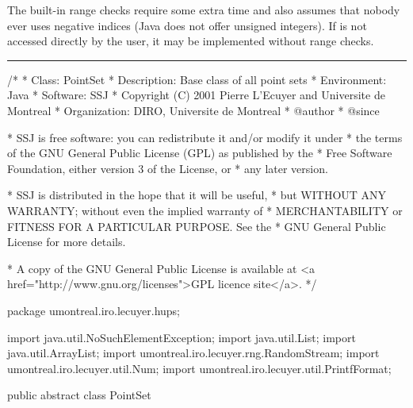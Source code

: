 \begin{detailed}  %
The built-in range checks require some extra time and also
assumes that nobody ever uses negative indices (Java does not offer unsigned
integers).  If  is not accessed directly by the user,
it may be implemented without range checks.
\end{detailed}  %

\bigskip\hrule\bigskip

\begin{code}
\begin{hide}
/*
 * Class:        PointSet
 * Description:  Base class of all point sets
 * Environment:  Java
 * Software:     SSJ 
 * Copyright (C) 2001  Pierre L'Ecuyer and Universite de Montreal
 * Organization: DIRO, Universite de Montreal
 * @author       
 * @since

 * SSJ is free software: you can redistribute it and/or modify it under
 * the terms of the GNU General Public License (GPL) as published by the
 * Free Software Foundation, either version 3 of the License, or
 * any later version.

 * SSJ is distributed in the hope that it will be useful,
 * but WITHOUT ANY WARRANTY; without even the implied warranty of
 * MERCHANTABILITY or FITNESS FOR A PARTICULAR PURPOSE.  See the
 * GNU General Public License for more details.

 * A copy of the GNU General Public License is available at
   <a href="http://www.gnu.org/licenses">GPL licence site</a>.
 */
\end{hide}
package umontreal.iro.lecuyer.hups;\begin{hide}

import java.util.NoSuchElementException;
import java.util.List;
import java.util.ArrayList;
import umontreal.iro.lecuyer.rng.RandomStream;
import umontreal.iro.lecuyer.util.Num;
import umontreal.iro.lecuyer.util.PrintfFormat;
\end{hide}

public abstract class PointSet \begin{hide} {

   // The maximum number of usable bits (binary digits).
   // Since Java has no unsigned type, the
   // 32nd bit cannot be used efficiently. This mainly affects digit
   // scrambling and bit vectors. This also limits the maximum number
   // of columns for the generating matrices of digital nets in base 2.
   protected static final int MAXBITS = 31;
   // To avoid 0 for nextCoordinate when random shifting 
   protected double EpsilonHalf = 1.0 / Num.TWOEXP[55];  // 1/2^55

   protected int dim = 0;
   protected int numPoints = 0;
   protected int dimShift = 0;            // Current dimension of the shift.
   protected int capacityShift = 0;       // Number of array elements of shift;
                                          // it is always >= dimShift
   protected RandomStream shiftStream;    // Used to generate random shifts.
\end{hide}
\end{code}

